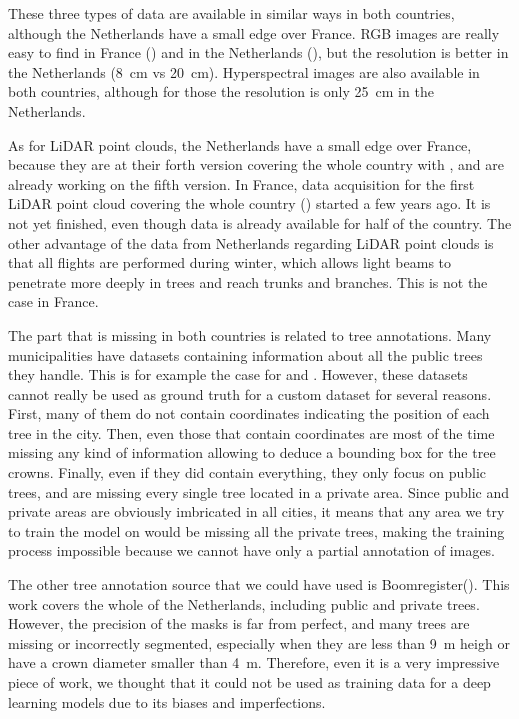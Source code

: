 \documentclass[
]{report}
\begin{document}
These three types of data are available in similar ways in both
countries, although the Netherlands have a small edge over France. RGB
images are really easy to find in France (\textcite{IGN_BDORTHO}) and in
the Netherlands (\textcite{Luchtfotos}), but the resolution is better in
the Netherlands (8~cm vs 20~cm). Hyperspectral images are also available
in both countries, although for those the resolution is only 25~cm in
the Netherlands.

As for LiDAR point clouds, the Netherlands have a small edge over
France, because they are at their forth version covering the whole
country with \textcite{AHN4}, and are already working on the fifth
version. In France, data acquisition for the first LiDAR point cloud
covering the whole country (\textcite{IGN_LiDARHD}) started a few years
ago. It is not yet finished, even though data is already available for
half of the country. The other advantage of the data from Netherlands
regarding LiDAR point clouds is that all flights are performed during
winter, which allows light beams to penetrate more deeply in trees and
reach trunks and branches. This is not the case in France.

The part that is missing in both countries is related to tree
annotations. Many municipalities have datasets containing information
about all the public trees they handle. This is for example the case for
\textcite{amsterdam_trees} and \textcite{bordeaux_trees}. However, these
datasets cannot really be used as ground truth for a custom dataset for
several reasons. First, many of them do not contain coordinates
indicating the position of each tree in the city. Then, even those that
contain coordinates are most of the time missing any kind of information
allowing to deduce a bounding box for the tree crowns. Finally, even if
they did contain everything, they only focus on public trees, and are
missing every single tree located in a private area. Since public and
private areas are obviously imbricated in all cities, it means that any
area we try to train the model on would be missing all the private
trees, making the training process impossible because we cannot have
only a partial annotation of images.

The other tree annotation source that we could have used is
Boomregister(\textcite{boomregister}). This work covers the whole of the
Netherlands, including public and private trees. However, the precision
of the masks is far from perfect, and many trees are missing or
incorrectly segmented, especially when they are less than 9~m heigh or
have a crown diameter smaller than 4~m. Therefore, even it is a very
impressive piece of work, we thought that it could not be used as
training data for a deep learning models due to its biases and
imperfections.
\end{document}
